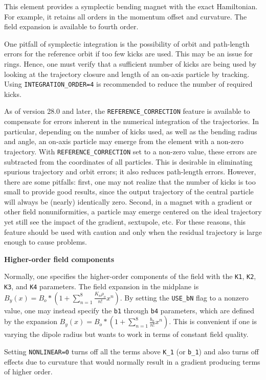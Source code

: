 This element provides a symplectic bending magnet with the exact
Hamiltonian.  For example, it retains all orders in the momentum offset
and curvature.  The field expansion is available to fourth order.

One pitfall of symplectic integration is the possibility of orbit and
path-length errors for the reference orbit if too few kicks are used.
This may be an issue for rings.  Hence, one must verify that a
sufficient number of kicks are being used by looking at the trajectory
closure and length of an on-axis particle by tracking.  Using 
{\tt INTEGRATION\_ORDER=4} is recommended to reduce the number of
required kicks.

As of version 28.0 and later, the \verb|REFERENCE_CORRECTION| feature is available
to compensate for errors inherent in the numerical integration of the trajectories.
In particular, depending on the number of kicks used, as well as the bending radius and angle,
an on-axis particle may emerge from the element with a non-zero trajectory.
With \verb|REFERENCE_CORRECTION| set to a non-zero value, these errors are subtracted from the
coordinates of all particles.
This is desirable in eliminating spurious trajectory and orbit errors; it also reduces path-length
errors.
However, there are some pitfalls: first, one may not realize that the number of kicks is too small to
provide good results, since the output trajectory of the central particle will always be
(nearly) identically zero. Second, in a magnet with a gradient or other field nonuniformities, 
a particle may emerge centered on the ideal trajectory yet still see the impact of the gradient, sextupole, etc.
For these reasons, this feature should be used with caution and only when the residual trajectory is 
large enough to cause problems.

{\bf Higher-order field components}

Normally, one specifies the higher-order components of the field with
the {\tt K1}, {\tt K2}, {\tt K3}, and {\tt K4} parameters. The field
expansion in the midplane is $B_y(x) = B_o * (1 +
\sum_{n=1}^8\frac{K_n\rho_o}{n!}x^n)$.  By setting the {\tt USE\_bN}
flag to a nonzero value, one may instead specify the {\tt b1} through
{\tt b4} parameters, which are defined by the expansion $B_y(x) = B_o
* (1 + \sum_{n=1}^8\frac{b_n}{n!}x^n)$.  This is convenient if one is
varying the dipole radius but wants to work in terms of constant field
quality.  

Setting {\tt NONLINEAR=0} turns off all the terms above {\tt K\_1} (or {\tt b\_1}) and
also turns off effects due to curvature that would
normally result in a gradient producing terms of higher order.

